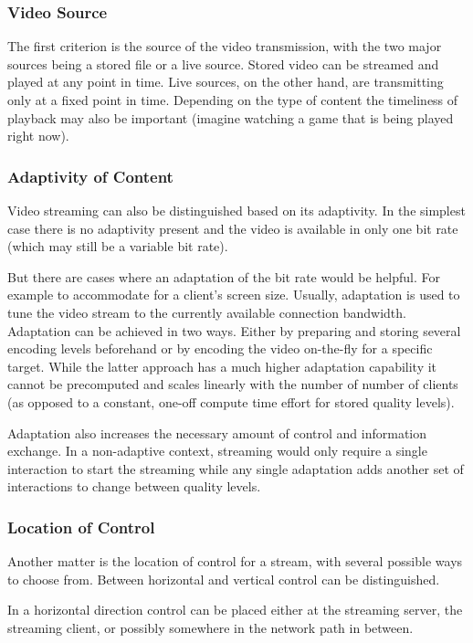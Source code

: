 \subsubsection{Video Source}
The first criterion is the source of the video transmission, with the two major sources being a stored file or a live source. Stored video can be streamed and played at any point in time. Live sources, on the other hand, are transmitting only at a fixed point in time. Depending on the type of content the timeliness of playback may also be important (imagine watching a game that is being played right now).


\subsubsection{Adaptivity of Content}
Video streaming can also be distinguished based on its adaptivity. In the simplest case there is no adaptivity present and the video is available in only one bit rate (which may still be a variable bit rate). 

But there are cases where an adaptation of the bit rate would be helpful. For example to accommodate for a client's screen size. Usually, adaptation is used to tune the video stream to the currently available connection bandwidth. Adaptation can be achieved in two ways. Either by preparing and storing several encoding levels beforehand or by encoding the video on-the-fly for a specific target. While the latter approach has a much higher adaptation capability it cannot be precomputed and scales linearly with the number of  number of clients (as opposed to a constant, one-off compute time effort for stored quality levels).

Adaptation also increases the necessary amount of control and information exchange. In a non-adaptive context, streaming would only require a single interaction to start the streaming while any single adaptation adds another set of interactions to change between quality levels.


\subsubsection{Location of Control}
Another matter is the location of control for a stream, with several possible ways to choose from. Between horizontal and vertical control can be distinguished.

In a horizontal direction control can be placed either at the streaming server, the streaming client, or possibly somewhere in the network path in between.

